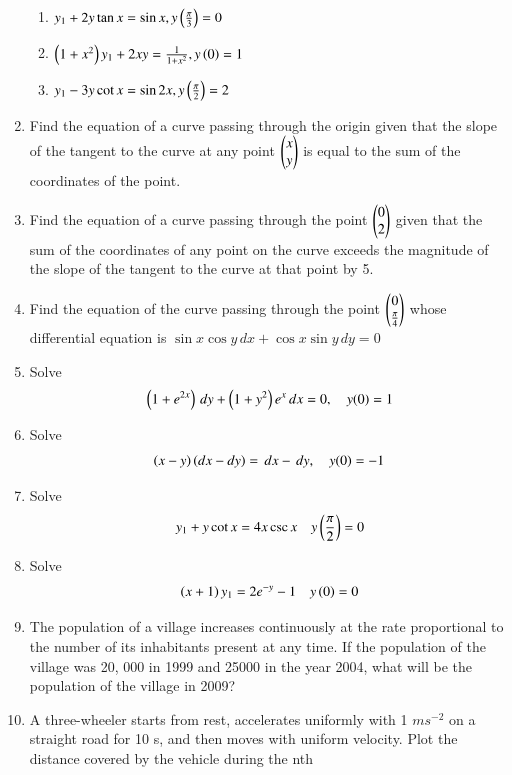 \begin{enumerate}[label=\arabic*.,ref=\thesubsection.\theenumi]
\begin{enumerate}[label=(\roman*)]
%
\item  $y_1 + 2y\tan x = \sin x, y\left(\frac{\pi}{3}\right) = 0$
\item  $\left(1+x^2\right)y_1 + 2xy = \frac{1}{1+x^2}, y\left(0\right) = 1$
\item  $y_1 - 3y\cot x = \sin 2x, y\left(\frac{\pi}{2}\right) = 2$
\end{enumerate}
\item Find the equation of a curve passing through the origin given that the slope of the tangent to the curve at any point $\begin{pmatrix}x\\ y\end{pmatrix}$ is equal to the sum of the coordinates of the point.
\item  Find the equation of a curve passing through the point $\begin{pmatrix}0\\ 2\end{pmatrix}$ given that the sum of the coordinates of any point on the curve exceeds the magnitude of the slope of the tangent to the curve at that point by 5.
%
\item Find the equation of the curve passing through the point $\begin{pmatrix}0\\ \frac{\pi}{4}\end{pmatrix}$ whose differential equation is $\sin x \cos y \, dx + \cos x \sin y \, dy = 0$
%
\item Solve 
%
\begin{align}
\left(1+e^{2x}\right)\, dy +\left(1+y^2\right)e^{x} \, dx = 0, \quad y(0) = 1
\end{align}
%
\item Solve
%
\begin{align}
\left(x-y\right)\left(dx-dy\right)  = \, dx - \, dy, \quad y(0) = -1
\end{align}
%
\item Solve
%
\begin{align}
y_1 + y\cot x = 4x\csc x \quad y\left(\frac{\pi}{2}\right) = 0
\end{align}
%
\item Solve
%
\begin{align}
\left(x+1\right)y_1  = 2e^{-y} - 1 \quad y\left(0\right) = 0
\end{align}
%
\item The population of a village increases continuously at the rate proportional to the number of its inhabitants present at any time. If the population of the village was 20, 000 in 1999 and 25000 in the year 2004, what will be the population of the village in 2009?
\item A three-wheeler starts from rest, accelerates uniformly with 1 $m s^{-2}$
on a straight
road for 10 s, and then moves with uniform velocity. Plot the distance covered by the vehicle during the nth

\end{enumerate}

